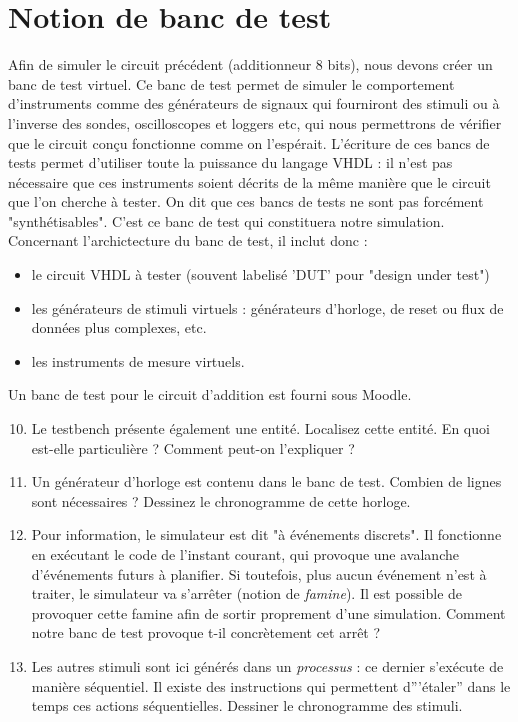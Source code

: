 \documentclass[a4paper,11pt]{article}
\begin{document}
\section{Notion de banc de test}
Afin de simuler le circuit précédent (additionneur 8 bits), nous devons créer un banc de test virtuel. Ce banc de test
permet de simuler le comportement d'instruments comme des générateurs de signaux qui fourniront des stimuli ou à l'inverse
des sondes, oscilloscopes et loggers etc, qui nous permettrons de vérifier que le circuit conçu fonctionne comme on l'espérait.
L'écriture de ces bancs de tests permet d'utiliser toute la puissance du langage VHDL : il n'est pas nécessaire que ces instruments soient
décrits de la même manière que le circuit que l'on cherche à tester. On dit que ces bancs de tests ne sont pas forcément "synthétisables".
C'est ce banc de test qui constituera notre simulation.
Concernant l'archictecture du banc de test, il inclut donc :
\begin{itemize}
  \item le circuit VHDL à tester (souvent labelisé 'DUT' pour "design under test")
  \item les générateurs de stimuli virtuels : générateurs d'horloge, de reset ou flux de données plus complexes, etc.
  \item les instruments de mesure virtuels.
\end{itemize}

Un banc de test pour le circuit d'addition est fourni sous Moodle.

\begin{enumerate}
  \setcounter{enumi}{9}
  \item Le testbench présente également une entité. Localisez cette entité. En quoi est-elle particulière ? Comment peut-on l'expliquer ?
  \item Un générateur d'horloge est contenu dans le banc de test. Combien de lignes sont nécessaires ? Dessinez le chronogramme de cette horloge.
  \item Pour information, le simulateur est dit "à événements discrets". Il fonctionne en exécutant le code de l'instant courant, qui provoque une avalanche d'événements futurs à planifier. Si toutefois, plus aucun
  événement n'est à traiter, le simulateur va s'arrêter (notion de {\it famine}).
  Il est possible de provoquer cette famine afin de sortir proprement d'une simulation. Comment notre banc de test provoque t-il concrètement cet arrêt ?
  \item Les autres stimuli sont ici générés dans un {\it processus} : ce dernier  s'exécute de manière séquentiel.
  Il existe des instructions qui permettent d'''étaler'' dans le temps ces actions séquentielles. Dessiner le chronogramme des stimuli.
\end{enumerate}
\end{document}
